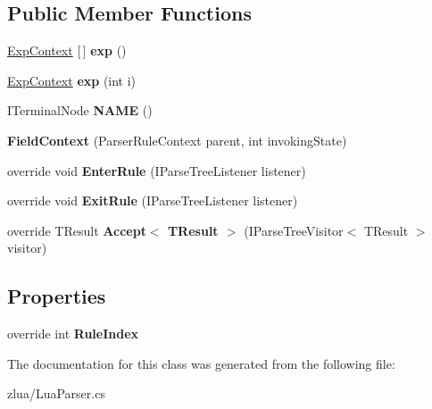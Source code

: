 \subsection*{Public Member Functions}
\begin{DoxyCompactItemize}
\item 
\mbox{\label{classzlua_1_1_lua_parser_1_1_field_context_af0f3069d6a75841c84261ac120d11c1e}} 
\mbox{\hyperlink{classzlua_1_1_lua_parser_1_1_exp_context}{Exp\+Context}} \mbox{[}$\,$\mbox{]} {\bfseries exp} ()
\item 
\mbox{\label{classzlua_1_1_lua_parser_1_1_field_context_ab46b73d545118459c7de9104d7088433}} 
\mbox{\hyperlink{classzlua_1_1_lua_parser_1_1_exp_context}{Exp\+Context}} {\bfseries exp} (int i)
\item 
\mbox{\label{classzlua_1_1_lua_parser_1_1_field_context_a95d8cdae083920fa6a668a5c18ebdbc9}} 
I\+Terminal\+Node {\bfseries N\+A\+ME} ()
\item 
\mbox{\label{classzlua_1_1_lua_parser_1_1_field_context_afedb127158a075e7dbe2f35706c7bbed}} 
{\bfseries Field\+Context} (Parser\+Rule\+Context parent, int invoking\+State)
\item 
\mbox{\label{classzlua_1_1_lua_parser_1_1_field_context_ad61a7f19c4830c34478bc73e91f187e3}} 
override void {\bfseries Enter\+Rule} (I\+Parse\+Tree\+Listener listener)
\item 
\mbox{\label{classzlua_1_1_lua_parser_1_1_field_context_a4876ac018d9668a7cb374c6095c8622b}} 
override void {\bfseries Exit\+Rule} (I\+Parse\+Tree\+Listener listener)
\item 
\mbox{\label{classzlua_1_1_lua_parser_1_1_field_context_ab07e61d8a13d29243cfa63ffd6e3218c}} 
override T\+Result {\bfseries Accept$<$ T\+Result $>$} (I\+Parse\+Tree\+Visitor$<$ T\+Result $>$ visitor)
\end{DoxyCompactItemize}
\subsection*{Properties}
\begin{DoxyCompactItemize}
\item 
\mbox{\label{classzlua_1_1_lua_parser_1_1_field_context_a295ae239b384e10ed543b537eabc4034}} 
override int {\bfseries Rule\+Index}
\end{DoxyCompactItemize}


The documentation for this class was generated from the following file\+:\begin{DoxyCompactItemize}
\item 
zlua/Lua\+Parser.\+cs\end{DoxyCompactItemize}
